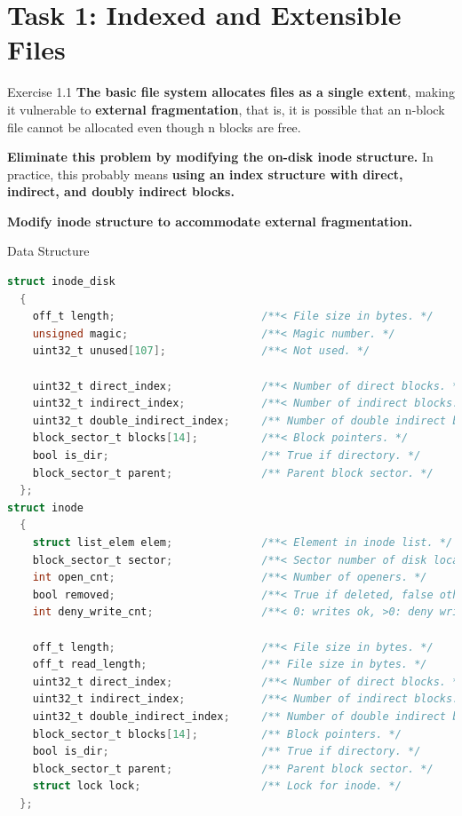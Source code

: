 \documentclass[10pt]{beamer}
\begin{document}
\section{Task 1: Indexed and Extensible Files}
\begin{frame}[fragile]{Exercise 1.1}
    \textbf{The basic file system allocates files as a single extent}, making it vulnerable to \textbf{external fragmentation}, that is, it is possible that an n-block file cannot be allocated even though n blocks are free.

\textbf{Eliminate this problem by modifying the on-disk inode structure.} In practice, this probably means \textbf{using an index structure with direct, indirect, and doubly indirect blocks.}

\textbf{Modify inode structure to accommodate external fragmentation.}
\end{frame}
\begin{frame}[fragile]{Data Structure}
\begin{lstlisting}[language=C]
struct inode_disk
  {
    off_t length;                       /**< File size in bytes. */
    unsigned magic;                     /**< Magic number. */
    uint32_t unused[107];               /**< Not used. */

    uint32_t direct_index;              /**< Number of direct blocks. */
    uint32_t indirect_index;            /**< Number of indirect blocks. */
    uint32_t double_indirect_index;     /** Number of double indirect blocks. */
    block_sector_t blocks[14];          /**< Block pointers. */
    bool is_dir;                        /** True if directory. */
    block_sector_t parent;              /** Parent block sector. */
  };
struct inode 
  {
    struct list_elem elem;              /**< Element in inode list. */
    block_sector_t sector;              /**< Sector number of disk location. */
    int open_cnt;                       /**< Number of openers. */
    bool removed;                       /**< True if deleted, false otherwise. */
    int deny_write_cnt;                 /**< 0: writes ok, >0: deny writes. */

    off_t length;                       /**< File size in bytes. */
    off_t read_length;                  /** File size in bytes. */
    uint32_t direct_index;              /**< Number of direct blocks. */
    uint32_t indirect_index;            /**< Number of indirect blocks. */
    uint32_t double_indirect_index;     /** Number of double indirect blocks. */
    block_sector_t blocks[14];          /** Block pointers. */
    bool is_dir;                        /** True if directory. */
    block_sector_t parent;              /** Parent block sector. */
    struct lock lock;                   /** Lock for inode. */
  };
\end{lstlisting}
\end{frame}
\end{document}

